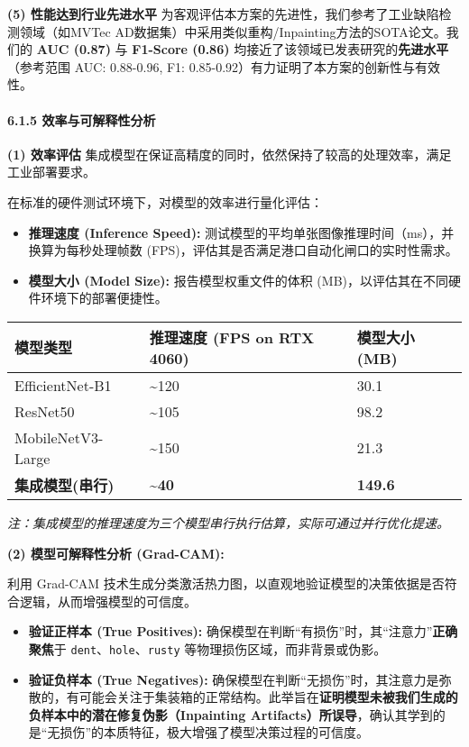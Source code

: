 \documentclass[
]{article}
\begin{document}
\textbf{(5) 性能达到行业先进水平}
为客观评估本方案的先进性，我们参考了工业缺陷检测领域（如MVTec
AD数据集）中采用类似重构/Inpainting方法的SOTA论文。我们的 \textbf{AUC
(0.87)} 与 \textbf{F1-Score (0.86)}
均接近了该领域已发表研究的\textbf{先进水平}（参考范围 AUC: 0.88-0.96,
F1: 0.85-0.92）有力证明了本方案的创新性与有效性。

\paragraph{\texorpdfstring{\textbf{6.1.5
效率与可解释性分析}}{6.1.5 效率与可解释性分析}}\label{615-ux6548ux7387ux4e0eux53efux89e3ux91caux6027ux5206ux6790}

\textbf{(1) 效率评估}
集成模型在保证高精度的同时，依然保持了较高的处理效率，满足工业部署要求。

在标准的硬件测试环境下，对模型的效率进行量化评估：

\begin{itemize}
\item
  \textbf{推理速度 (Inference Speed):}
  测试模型的平均单张图像推理时间（ms），并换算为每秒处理帧数
  (FPS)，评估其是否满足港口自动化闸口的实时性需求。
\item
  \textbf{模型大小 (Model Size):} 报告模型权重文件的体积
  (MB)，以评估其在不同硬件环境下的部署便捷性。
\end{itemize}

\begin{longtable}[]{@{}lll@{}}
\toprule\noalign{}
模型类型 & 推理速度 (FPS on RTX 4060) & 模型大小 (MB) \\
\midrule\noalign{}
\endhead
\bottomrule\noalign{}
\endlastfoot
EfficientNet-B1 & \textasciitilde120 & 30.1 \\
ResNet50 & \textasciitilde105 & 98.2 \\
MobileNetV3-Large & \textasciitilde150 & 21.3 \\
\textbf{集成模型(串行)} & \textbf{\textasciitilde40} & \textbf{149.6} \\
\end{longtable}

\emph{注：集成模型的推理速度为三个模型串行执行估算，实际可通过并行优化提速。}

\textbf{(2) 模型可解释性分析 (Grad-CAM):}

利用 Grad-CAM
技术生成分类激活热力图，以直观地验证模型的决策依据是否符合逻辑，从而增强模型的可信度。

\begin{itemize}
\item
  \textbf{验证正样本 (True Positives):}
  确保模型在判断``有损伤''时，其``注意力''\textbf{正确聚焦}于
  \texttt{dent}、\texttt{hole}、\texttt{rusty}
  等物理损伤区域，而非背景或伪影。
\item
  \textbf{验证负样本 (True Negatives):}
  确保模型在判断``无损伤''时，其注意力是弥散的，有可能会关注于集装箱的正常结构。此举旨在\textbf{证明模型未被我们生成的负样本中的潜在修复伪影（Inpainting
  Artifacts）所误导}，确认其学到的是``无损伤''的本质特征，极大增强了模型决策过程的可信度。
\end{itemize}
\end{document}
